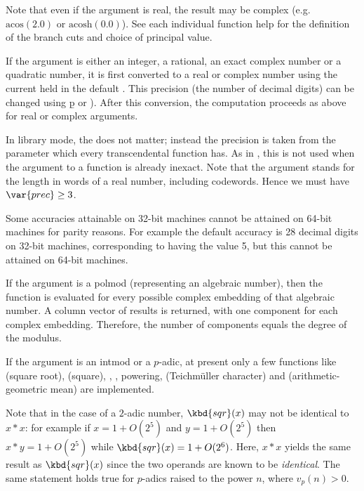 Note that even if the argument is real, the result may be complex
(e.g.~$\text{acos}(2.0)$ or $\text{acosh}(0.0)$). See each individual
function help for the definition of the branch cuts and choice of principal
value.

\item If the argument is either an integer, a rational, an exact complex
number or a quadratic number, it is first converted to a real
or complex number using the current  held in the default
.  This precision (the number of decimal digits) can be
changed using \b{p} or ).
After this conversion, the computation proceeds as above for real or complex
arguments.

In library mode, the  does not matter; instead the
precision is taken from the  parameter which every transcendental
function has.  As in , this  is not used when the
argument to a function is already inexact.
Note that the argument  stands for the length in words of a real
number, including codewords. Hence we must have $\var{prec} \geq 3$.

Some accuracies attainable on 32-bit machines cannot be attained
on 64-bit machines for parity reasons. For example the default  accuracy
is 28 decimal digits on 32-bit machines, corresponding to  having
the value 5, but this cannot be attained on 64-bit machines.

\item If the argument is a polmod (representing an algebraic number),
then the function is evaluated for every possible complex embedding of that
algebraic number.  A column vector of results is returned, with one component
for each complex embedding.  Therefore, the number of components equals
the degree of the  modulus.

\item If the argument is an intmod or a $p$-adic, at present only a
few functions like  (square root),  (square), ,
, powering,  (Teichm\"uller character) and
 (arithmetic-geometric mean) are implemented.

Note that in the case of a $2$-adic number, $\kbd{sqr}(x)$ may not be
identical to $x*x$: for example if $x = 1+O(2^5)$ and $y = 1+O(2^5)$ then
$x*y = 1+O(2^5)$ while $\kbd{sqr}(x) = 1+O(2^6)$. Here, $x * x$ yields the
same result as $\kbd{sqr}(x)$ since the two operands are known to be
\emph{identical}. The same statement holds true for $p$-adics raised to the
power $n$, where $v_p(n) > 0$.

